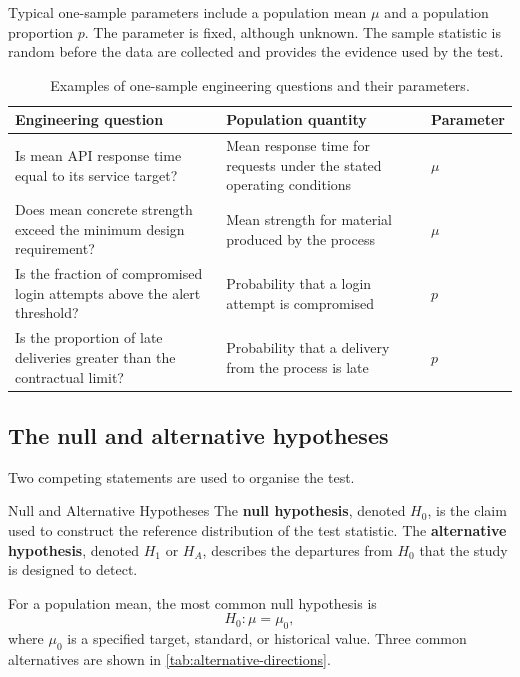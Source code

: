 Typical one-sample parameters include a population mean $\mu$ and a population proportion $p$. The parameter is fixed, although unknown. The sample statistic is random before the data are collected and provides the evidence used by the test.

\begin{table}[htbp]
\centering
\caption{Examples of one-sample engineering questions and their parameters.}
\label{tab:one-sample-questions}
\begin{tabularx}{\textwidth}{@{}>{\raggedright\arraybackslash}X>{\raggedright\arraybackslash}Xl@{}}
\toprule
Engineering question & Population quantity & Parameter \\
\midrule
Is mean API response time equal to its service target? & Mean response time for requests under the stated operating conditions & $\mu$ \\
Does mean concrete strength exceed the minimum design requirement? & Mean strength for material produced by the process & $\mu$ \\
Is the fraction of compromised login attempts above the alert threshold? & Probability that a login attempt is compromised & $p$ \\
Is the proportion of late deliveries greater than the contractual limit? & Probability that a delivery from the process is late & $p$ \\
\bottomrule
\end{tabularx}
\end{table}

\subsection{The null and alternative hypotheses}

Two competing statements are used to organise the test.

\begin{definition}{Null and Alternative Hypotheses}
The \textbf{null hypothesis}, denoted $H_0$, is the claim used to construct the reference distribution of the test statistic. The \textbf{alternative hypothesis}, denoted $H_1$ or $H_A$, describes the departures from $H_0$ that the study is designed to detect.
\end{definition}

For a population mean, the most common null hypothesis is
\[
H_0:\mu=\mu_0,
\]
where $\mu_0$ is a specified target, standard, or historical value. Three common alternatives are shown in \autoref{tab:alternative-directions}.

